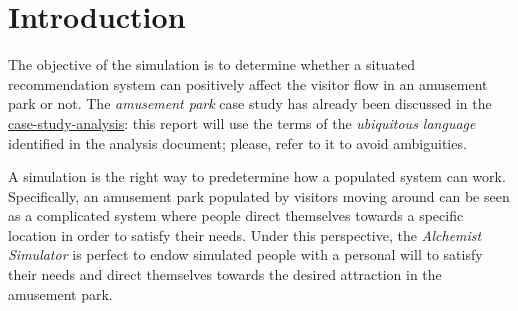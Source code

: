 \section{Introduction}

The objective of the simulation is to determine whether a situated recommendation system can positively affect the visitor flow in an amusement park or not. The \textit{amusement park} case study has already been discussed in the \href{https://github.com/ICPS-MicroCity/case-study-analysis/releases/tag/v0.2.1}{case-study-analysis}: this report will use the terms of the \textit{ubiquitous language} identified in the analysis document; please, refer to it to avoid ambiguities.

A simulation is the right way to predetermine how a populated system can work. Specifically, an amusement park populated by visitors moving around can be seen as a complicated system where people direct themselves towards a specific location in order to satisfy their needs. Under this perspective, the \textit{Alchemist Simulator} \cite{Pianini_2013} is perfect to endow simulated people with a personal will to satisfy their needs and direct themselves towards the desired attraction in the amusement park.